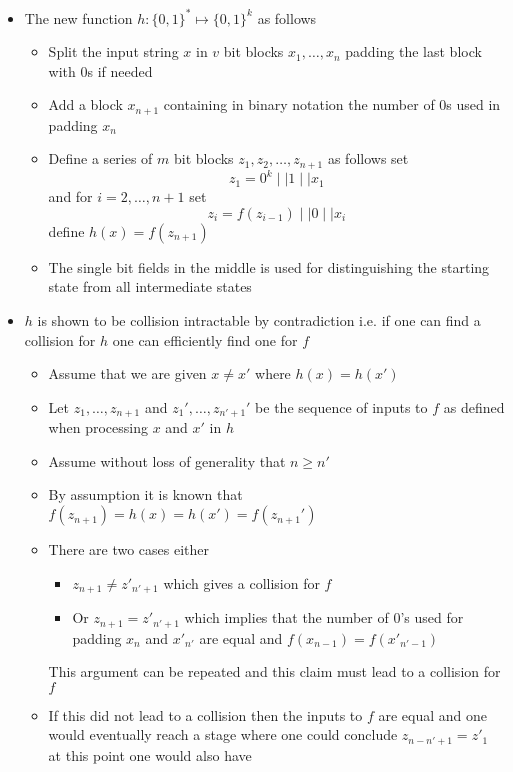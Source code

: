\begin{itemize}
\begin{itemize}
    \item The new function $h: \{0,1\}^* \mapsto \{0,1\}^k$ as follows 
    \begin{itemize}
    	\item Split the input string $x$ in $v$ bit blocks $x_1, \dots, x_n$ padding the last block with $0$s if needed
      \item Add a block $x_{n+1}$ containing in binary notation the number of $0$s used in padding $x_n$
      \item Define a series of $m$ bit blocks $z_1, z_2, \dots, z_{n+1}$ as follows set 
      \[
        z_1 = 0^k \mid \mid 1 \mid \mid x_1
      \]
      and for $i=2,\dots,n+1$ set
      \[
        z_i = f(z_{i-1}) \mid \mid 0 \mid \mid x_i
      \]
      define $h(x) = f(z_{n+1})$
      \item The single bit fields in the middle is used for distinguishing the starting state from all intermediate states
    \end{itemize}
    \item $h$ is shown to be collision intractable by contradiction i.e. if one can find a collision for $h$ one can efficiently find one for $f$
    \begin{itemize}
      \item Assume that we are given $x \neq x'$ where $h(x) = h(x')$
      \item Let $z_1, \dots, z_{n+1}$ and $z_1',\dots, z_{n'+1}'$ be the sequence of inputs to $f$ as defined when processing $x$ and $x'$ in $h$ 
      \item Assume without loss of generality that $n \geq n'$ 
      \item By assumption it is known that $f(z_{n+1}) = h(x) = h(x') = f(z_{n+1}')$
      \item There are two cases either
      \begin{itemize}
      	\item $z_{n+1} \neq z'_{n'+1}$ which gives a collision for $f$ 
        \item Or $z_{n+1} = z'_{n'+1}$ which implies that the number of $0$'s used for padding $x_n$ and $x'_{n'}$ are equal and $f(x_{n-1}) = f(x'_{n' -1 })$ 
      \end{itemize}
      This argument can be repeated and this claim must lead to a collision for $f$
      \item If this did not lead to a collision then the inputs to $f$ are equal and one would eventually reach a stage where one could conclude $z_{n-n'+1} = z'_1$ at this point one would also have

\end{itemize}
\end{itemize}
\end{itemize}
